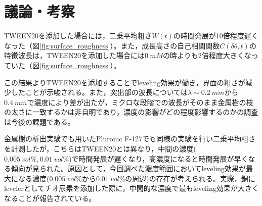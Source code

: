 \documentclass[autodetect-engine,dvi=dvipdfmx,a4paper,ja=standard,oneside,openany,11pt,draft]{bxjsbook}
\begin{document}
\section{議論・考察}
TWEEN20を添加した場合には，二乗平均粗さ$W(t)$の時間発展が10倍程度遅くなった（図\ref{fig:surface_roughness}）。また，成長高さの自己相関関数$C(\delta\theta,t)$の特徴波長は，TWEEN20を添加した場合には$\SI{0}{mM}$の時よりも2倍程度大きくなっていた（図\ref{fig:surface_roughness}）。

この結果よりTWEEN20を添加することでleveling効果が働き，界面の粗さが減少したことが示唆される。また，突出部の波長については$\lambda\sim\SI{0.2}{mm}$から$\SI{0.4}{mm}$で濃度により差が出たが，ミクロな段階での波長がそのまま金属樹の枝の太さに一致するかは非自明であり，濃度の影響がどの程度影響するのかの調査は今後の課題である。

金属樹の析出実験でも用いたPluronic F-127でも同様の実験を行い二乗平均粗さを計測したが，こちらはTWEEN20とは異なり，中間の濃度($\SI{0.005}{vol\%},\SI{0.01}{vol\%}$)で時間発展が遅くなり，高濃度になると時間発展が早くなる傾向が見られた。原因として，今回調べた濃度範囲においてleveling効果が最大になる濃度($\SI{0.005}{vol\%}$から$\SI{0.01}{vol\%}$の周辺)の存在が考えられる。実際，銅にlevelerとしてチオ尿素を添加した際に，中間的な濃度で最もleveling効果が大きくなることが報告されている\cite{schilardi2000stable}。

\ifdraft{
  
  
}{}
\end{document}
